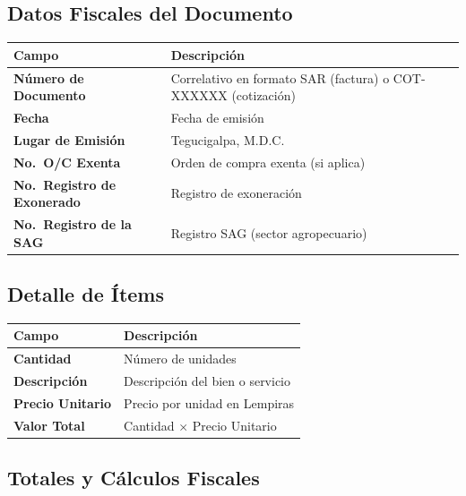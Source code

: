 \documentclass[12pt, letterpaper]{article}
\begin{document}
\subsection{Datos Fiscales del Documento}

\begin{tabularx}{\linewidth}{>{\bfseries}l X}
  \toprule
  Campo                         & Descripción                          \\
  \midrule
  Número de Documento           & Correlativo en formato SAR (factura)
                                  o COT-XXXXXX (cotización)             \\
  Fecha                         & Fecha de emisión                     \\
  Lugar de Emisión              & Tegucigalpa, M.D.C.                  \\
  No.\ O/C Exenta               & Orden de compra exenta (si aplica)   \\
  No.\ Registro de Exonerado    & Registro de exoneración              \\
  No.\ Registro de la SAG       & Registro SAG (sector agropecuario)   \\
  \bottomrule
\end{tabularx}

\subsection{Detalle de Ítems}

\begin{tabularx}{\linewidth}{>{\bfseries}l X}
  \toprule
  Campo          & Descripción                                         \\
  \midrule
  Cantidad       & Número de unidades                                  \\
  Descripción    & Descripción del bien o servicio                     \\
  Precio Unitario& Precio por unidad en Lempiras                       \\
  Valor Total    & Cantidad $\times$ Precio Unitario                   \\
  \bottomrule
\end{tabularx}

\subsection{Totales y Cálculos Fiscales}
\end{document}
